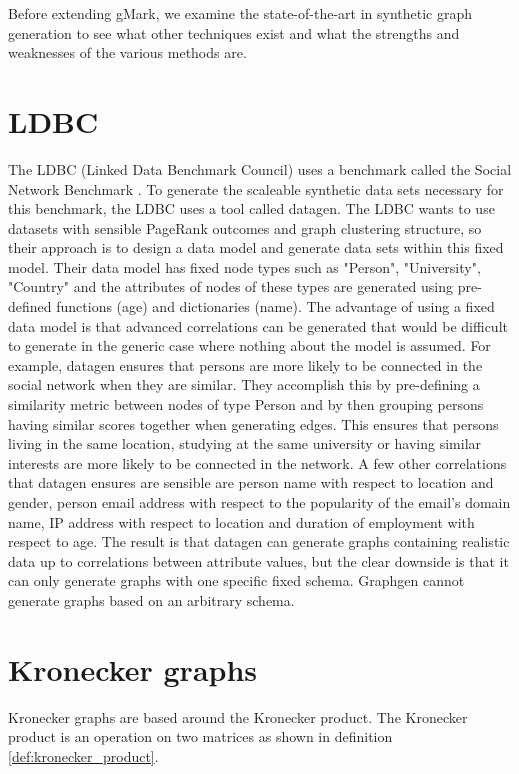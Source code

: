 Before extending gMark, we examine the state-of-the-art in synthetic graph generation to see what other techniques exist and what the strengths and weaknesses of the various methods are.

\section{LDBC}
The LDBC (Linked Data Benchmark Council) uses a benchmark called the Social Network Benchmark \cite{Erling2015TheBenchmark, LDBCBenchmark}. To generate the scaleable synthetic data sets necessary for this benchmark, the LDBC uses a tool called datagen. The LDBC wants to use datasets with sensible PageRank outcomes and graph clustering structure, so their approach is to design a data model and generate data sets within this fixed model. Their data model has fixed node types such as "Person", "University", "Country" and the attributes of nodes of these types are generated using pre-defined functions (age) and dictionaries (name).
The advantage of using a fixed data model is that advanced correlations can be generated that would be difficult to generate in the generic case where nothing about the model is assumed. For example, datagen ensures that persons are more likely to be connected in the social network when they are similar. They accomplish this by pre-defining a similarity metric between nodes of type Person and by then grouping persons having similar scores together when generating edges. This ensures that persons living in the same location, studying at the same university or having similar interests are more likely to be connected in the network.
A few other correlations that datagen ensures are sensible are person name with respect to location and gender, person email address with respect to the popularity of the email's domain name, IP address with respect to location and duration of employment with respect to age.
The result is that datagen can generate graphs containing realistic data up to correlations between attribute values, but the clear downside is that it can only generate graphs with one specific fixed schema. Graphgen cannot generate graphs based on an arbitrary schema.

\section{Kronecker graphs}
Kronecker graphs are based around the Kronecker product. The Kronecker product is an operation on two matrices as shown in definition \ref{def:kronecker_product}.

